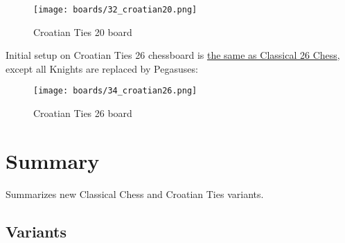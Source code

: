 \noindent
\begin{figure}[h]
\texttt{[image: boards/32\_croatian20.png]}
\caption{Croatian Ties 20 board}
\label{fig:32_croatian20}
\end{figure}

\vfill{}

\clearpage %

Initial setup on Croatian Ties 26 chessboard is
\hyperref[fig:28_classic26]{the same as Classical 26 Chess}, except all Knights
are replaced by Pegasuses:

\noindent
\begin{figure}[h]
\texttt{[image: boards/34\_croatian26.png]}
\caption{Croatian Ties 26 board}
\label{fig:34_croatian26}
\end{figure}

\vfill{}

\clearpage %

\section*{Summary}
\label{sec:Simple variants/Summary}

Summarizes new Classical Chess and Croatian Ties variants.

\subsection*{Variants}
\label{sec:Simple variants/Summary/Variants}

